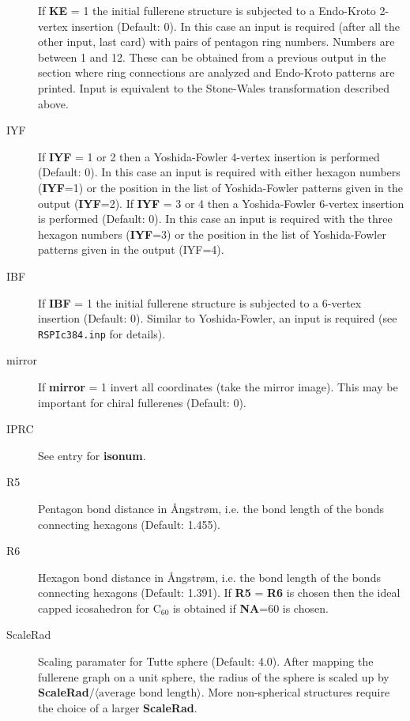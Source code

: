 \documentclass[article,a4paper,twoside]{memoir}
\newcommand{\C}[1]{\ensuremath{\mathrm{C}_{#1}}}
\newcommand{\filename}[1]{\texttt{#1}}
\newcommand{\paramname}[1]{{\color{green}\textbf{#1}}}
\begin{document}
\begin{description}
If \paramname{KE} = 1 the initial fullerene structure is subjected to a Endo-Kroto 2-vertex insertion (Default: 0).
In this case an input is required (after all the other input, last card) with pairs of
pentagon ring numbers. Numbers are between 1 and 12. These can be obtained
from a previous output in the section where ring connections are analyzed
and Endo-Kroto patterns are printed. Input is equivalent to the Stone-Wales transformation described above.
\item[IYF] 
If \paramname{IYF} = 1 or 2 then a Yoshida-Fowler 4-vertex insertion \cite{Yoshida97a} is performed (Default: 0). 
In this case an input is required  with either hexagon numbers (\paramname{IYF}=1) or the position in
the list of Yoshida-Fowler patterns given in the output (\paramname{IYF}=2).
If \paramname{IYF} = 3 or 4 then a Yoshida-Fowler 6-vertex insertion \cite{Yoshida97a} is performed (Default: 0). 
In this case an input is required with the three hexagon numbers (\paramname{IYF}=3) or the position in
the list of Yoshida-Fowler patterns given in the output (IYF=4).
\item[IBF] 
If \paramname{IBF} = 1 the initial fullerene structure is subjected to a 6-vertex insertion (Default: 0).
Similar to Yoshida-Fowler, an input is required (see \filename{RSPIc384.inp} for details).
\item[mirror] 
If \paramname{mirror} = 1 invert all coordinates (take the mirror image). This may be important for chiral fullerenes (Default: 0).
\item[IPRC] See entry for \paramname{isonum}.
\item[R5] Pentagon bond distance in \AA ngstr{\o}m, i.e. the bond length of the bonds connecting hexagons (Default: 1.455).
\item[R6] Hexagon  bond distance in \AA ngstr{\o}m, i.e. the bond length of the bonds connecting hexagons (Default: 1.391).
If \paramname{R5} = \paramname{R6} is chosen then the ideal capped icosahedron for \C{60} is obtained if \paramname{NA}=60 is chosen.
\item[ScaleRad] Scaling paramater for Tutte sphere (Default: 4.0).  After mapping the fullerene graph
on a unit sphere, the radius of the sphere is scaled up by \paramname{ScaleRad}$/\langle\text{average bond length}\rangle$.
More non-spherical structures require the choice of a larger \paramname{ScaleRad}.
\end{description}
\end{document}
